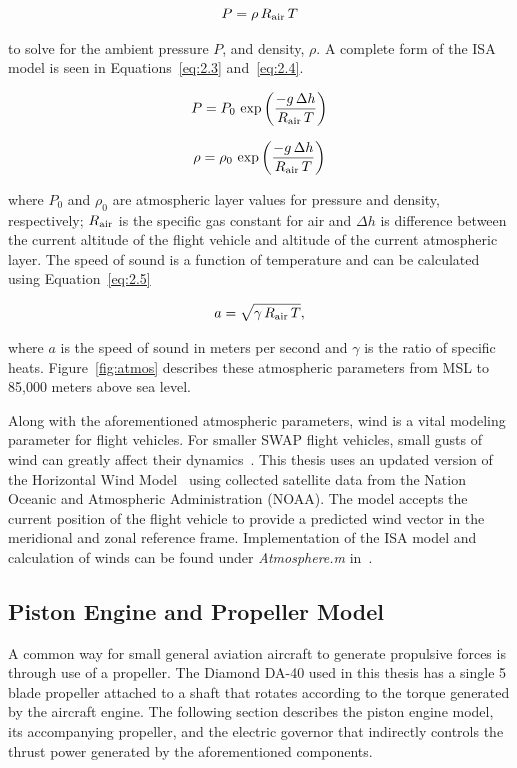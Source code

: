\documentclass[12pt]{report}
\begin{document}
\begin{equation}
  P = \rho \, R\textsubscript{air} \, T
  \label{eq:2.2}
\end{equation}

to solve for the ambient pressure \(P\), and density, \( \rho \). A complete form of the ISA model is seen in Equations~\ref{eq:2.3} and~\ref{eq:2.4}.

\begin{equation}
  P = P_0\,\exp\left({\frac{-g\,\Delta h}{R\textsubscript{air}\,T}}\right)
  \label{eq:2.3}
\end{equation}

\begin{equation}
  \rho = \rho_0\,\exp\left({\frac{-g\,\Delta h}{R\textsubscript{air}\,T}}\right)
  \label{eq:2.4}
\end{equation}

where \(P_0\) and \(\rho_0\) are atmospheric layer values for pressure and density, respectively; \(R\textsubscript{air}\) is the specific gas constant for air and \(\Delta h\) is difference between the current altitude of the flight vehicle and altitude of the current atmospheric layer. The speed of sound is a function of temperature and can be calculated using Equation~\ref{eq:2.5}

\begin{equation}
  a = \sqrt{\gamma \, R\textsubscript{air}\,T},
  \label{eq:2.5}
\end{equation}

where \(a\) is the speed of sound in meters per second and \( \gamma \) is the ratio of specific heats. Figure~\ref{fig:atmos} describes these atmospheric parameters from MSL to 85,000 meters above sea level.

Along with the aforementioned atmospheric parameters, wind is a vital modeling parameter for flight vehicles. For smaller SWAP flight vehicles, small gusts of wind can greatly affect their dynamics~\cite{raymerAircraftDesignConceptual2018}. This thesis uses an updated version of the Horizontal Wind Model~\cite{drobEmpiricalModelEarth2008,drobUpdateHorizontalWind2015} using collected satellite data from the Nation Oceanic and Atmospheric Administration (NOAA). The model accepts the current position of the flight vehicle to provide a predicted wind vector in the meridional and zonal reference frame. Implementation of the ISA model and calculation of winds can be found under \textit{Atmosphere.m} in~\cite{millerNsm0014thesis1969}.

\subsection{Piston Engine and Propeller Model}
A common way for small general aviation aircraft to generate propulsive forces is through use of a propeller. The Diamond DA-40 used in this thesis has a single 5 blade propeller attached to a shaft that rotates according to the torque generated by the aircraft engine. The following section describes the piston engine model, its accompanying propeller, and the electric governor that indirectly controls the thrust power generated by the aforementioned components.
\end{document}
